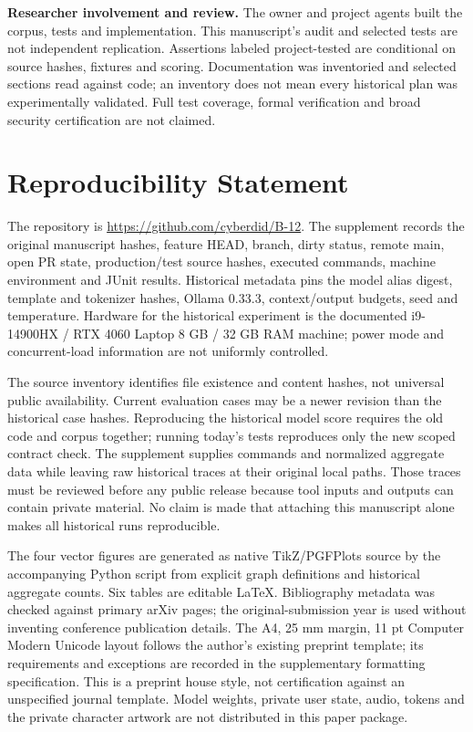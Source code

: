 \documentclass[11pt,a4paper]{article}
\begin{document}
\textbf{Researcher involvement and review.} The owner and project agents built the corpus, tests and implementation. This manuscript's audit and selected tests are not independent replication. Assertions labeled project-tested are conditional on source hashes, fixtures and scoring. Documentation was inventoried and selected sections read against code; an inventory does not mean every historical plan was experimentally validated. Full test coverage, formal verification and broad security certification are not claimed.

\section{Reproducibility Statement}\label{sec:repro}
The repository is \url{https://github.com/cyberdid/B-12}. The supplement records the original manuscript hashes, feature HEAD, branch, dirty status, remote main, open PR state, production/test source hashes, executed commands, machine environment and JUnit results. Historical metadata pins the model alias digest, template and tokenizer hashes, Ollama 0.33.3, context/output budgets, seed and temperature. Hardware for the historical experiment is the documented i9-14900HX / RTX 4060 Laptop 8 GB / 32 GB RAM machine; power mode and concurrent-load information are not uniformly controlled.

The source inventory identifies file existence and content hashes, not universal public availability. Current evaluation cases may be a newer revision than the historical case hashes. Reproducing the historical model score requires the old code and corpus together; running today's tests reproduces only the new scoped contract check. The supplement supplies commands and normalized aggregate data while leaving raw historical traces at their original local paths. Those traces must be reviewed before any public release because tool inputs and outputs can contain private material. No claim is made that attaching this manuscript alone makes all historical runs reproducible.

The four vector figures are generated as native TikZ/PGFPlots source by the accompanying Python script from explicit graph definitions and historical aggregate counts. Six tables are editable LaTeX. Bibliography metadata was checked against primary arXiv pages; the original-submission year is used without inventing conference publication details. The A4, 25 mm margin, 11 pt Computer Modern Unicode layout follows the author's existing preprint template; its requirements and exceptions are recorded in the supplementary formatting specification. This is a preprint house style, not certification against an unspecified journal template. Model weights, private user state, audio, tokens and the private character artwork are not distributed in this paper package.
\end{document}
